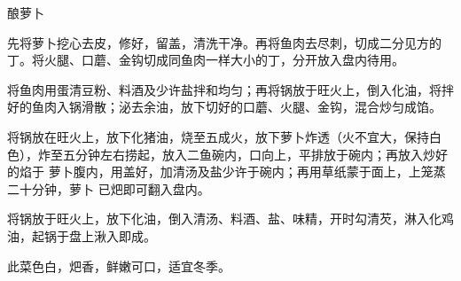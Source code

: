 %
%
%
%
%
%
%
\begin{recipe}{酿萝卜}

\ingredients


\preparation

\step 先将萝卜挖心去皮，修好，留盖，清洗干净。再将鱼肉去尽刺，切成二分见方的
丁。将火腿、口蘑、金钩切成同鱼肉一样大小的丁，分开放入盘内待用。

\step 将鱼肉用蛋清豆粉、料酒及少许盐拌和均匀；再将锅放于旺火上，倒入化油，将拌
好的鱼肉入锅滑散；泌去余油，放下切好的口蘑、火腿、金钩，混合炒匀成馅。

\step 将锅放在旺火上，放下化猪油，烧至五成火，放下萝卜炸透（火不宜大，保持白
色），炸至五分钟左右捞起，放入二鱼碗内，口向上，平排放于碗内；再放入炒好的焰于
萝卜腹内，用盖好，加清汤及盐少许于碗内；再用草纸蒙于面上，上笼蒸二十分钟，萝卜
已𤆵即可翻入盘内。

\step 将锅放于旺火上，放下化油，倒入清汤、料酒、盐、味精，开时勾清芡，淋入化鸡
油，起锅于盘上湫入即成。

\features

此菜色白，𤆵香，鲜嫩可口，适宜冬季。

\end{recipe}

